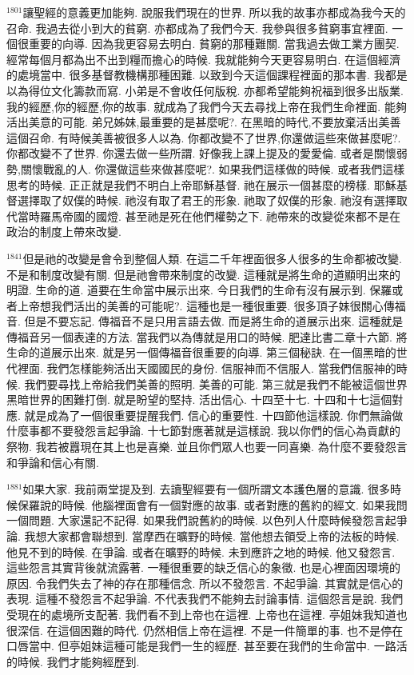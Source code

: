 \documentclass{book}
\begin{document}
$^{1801}$讓聖經的意義更加能夠.
說服我們現在的世界.
所以我的故事亦都成為我今天的召命.
我過去從小到大的貧窮.
亦都成為了我們今天.
我參與很多貧窮事宜裡面.
一個很重要的向導.
因為我更容易去明白.
貧窮的那種難關.
當我過去做工業方團契.
經常每個月都為出不出到糧而擔心的時候.
我就能夠今天更容易明白.
在這個經濟的處境當中.
很多基督教機構那種困難.
以致到今天這個課程裡面的那本書.
我都是以為得位文化籌款而寫.
小弟是不會收任何版稅.
亦都希望能夠祝福到很多出版業.
我的經歷,你的經歷,你的故事.
就成為了我們今天去尋找上帝在我們生命裡面.
能夠活出美意的可能.
弟兄姊妹,最重要的是甚麼呢?.
在黑暗的時代,不要放棄活出美善這個召命.
有時候美善被很多人以為.
你都改變不了世界,你還做這些來做甚麼呢?.
你都改變不了世界.
你還去做一些所謂.
好像我上課上提及的愛愛倫.
或者是關懷弱勢,關懷戰亂的人.
你還做這些來做甚麼呢?.
如果我們這樣做的時候.
或者我們這樣思考的時候.
正正就是我們不明白上帝耶穌基督.
祂在展示一個甚麼的榜樣.
耶穌基督選擇取了奴僕的時候.
祂沒有取了君王的形象.
祂取了奴僕的形象.
祂沒有選擇取代當時羅馬帝國的國燈.
甚至祂是死在他們權勢之下.
祂帶來的改變從來都不是在政治的制度上帶來改變.

$^{1841}$但是祂的改變是會令到整個人類.
在這二千年裡面很多人很多的生命都被改變.
不是和制度改變有關.
但是祂會帶來制度的改變.
這種就是將生命的道顯明出來的明證.
生命的道.
道要在生命當中展示出來.
今日我們的生命有沒有展示到.
保羅或者上帝想我們活出的美善的可能呢?.
這種也是一種很重要.
很多頂子妹很關心傳福音.
但是不要忘記.
傳福音不是只用言語去做.
而是將生命的道展示出來.
這種就是傳福音另一個表達的方法.
當我們以為傳就是用口的時候.
肥達比書二章十六節.
將生命的道展示出來.
就是另一個傳福音很重要的向導.
第三個秘訣.
在一個黑暗的世代裡面.
我們怎樣能夠活出天國國民的身份.
信服神而不信服人.
當我們信服神的時候.
我們要尋找上帝給我們美善的照明.
美善的可能.
第三就是我們不能被這個世界黑暗世界的困難打倒.
就是盼望的堅持.
活出信心.
十四至十七.
十四和十七這個對應.
就是成為了一個很重要提醒我們.
信心的重要性.
十四節他這樣說.
你們無論做什麼事都不要發怨言起爭論.
十七節對應著就是這樣說.
我以你們的信心為貢獻的祭物.
我若被囂現在其上也是喜樂.
並且你們眾人也要一同喜樂.
為什麼不要發怨言和爭論和信心有關.

$^{1881}$如果大家.
我前兩堂提及到.
去讀聖經要有一個所謂文本護色層的意識.
很多時候保羅說的時候.
他腦裡面會有一個對應的故事.
或者對應的舊約的經文.
如果我問一個問題.
大家還記不記得.
如果我們說舊約的時候.
以色列人什麼時候發怨言起爭論.
我想大家都會聯想到.
當摩西在曠野的時候.
當他想去領受上帝的法板的時候.
他見不到的時候.
在爭論.
或者在曠野的時候.
未到應許之地的時候.
他又發怨言.
這些怨言其實背後就流露著.
一種很重要的缺乏信心的象徵.
也是心裡面因環境的原因.
令我們失去了神的存在那種信念.
所以不發怨言.
不起爭論.
其實就是信心的表現.
這種不發怨言不起爭論.
不代表我們不能夠去討論事情.
這個怨言是說.
我們受現在的處境所支配著.
我們看不到上帝也在這裡.
上帝也在這裡.
亭姐妹我知道也很深信.
在這個困難的時代.
仍然相信上帝在這裡.
不是一件簡單的事.
也不是停在口唇當中.
但亭姐妹這種可能是我們一生的經歷.
甚至要在我們的生命當中.
一路活的時候.
我們才能夠經歷到.
\end{document}
